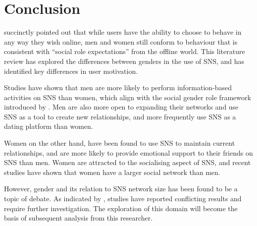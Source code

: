 \section{Conclusion}

\citet[p. 897]{Kimbrough2013} succinctly pointed out that while users have the ability to choose to behave in any way they wish online, men and women still conform to behaviour that is consistent with ``social role expectations'' from the offline world. This literature review has explored the differences between genders in the use of SNS, and has identified key differences in user motivation.

Studies have shown that men are more likely to perform information-based activities on SNS than women, which align with the social gender role framework introduced by \citet{Eagly1987}. Men are also more open to expanding their networks and use SNS as a tool to create new relationships, and more frequently use SNS as a dating platform than women.

Women on the other hand, have been found to use SNS to maintain current relationships, and are more likely to provide emotional support to their friends on SNS than men. Women are attracted to the socialising aspect of SNS, and recent studies have shown that women have a larger social network than men.

However, gender and its relation to SNS network size has been found to be a topic of debate. As indicated by \citet{Tifferet2014}, studies have reported conflicting results and require further investigation. The exploration of this domain will become the basis of subsequent analysis from this researcher.


